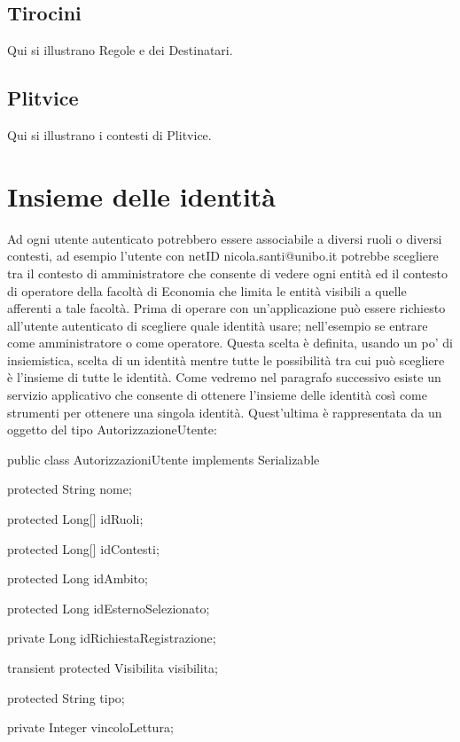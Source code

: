 \subsection{Tirocini}
Qui si illustrano Regole e dei Destinatari.

\subsection{Plitvice}
Qui si illustrano i contesti di Plitvice.

\section{Insieme delle identità }
Ad ogni utente autenticato potrebbero essere associabile a diversi ruoli o diversi contesti, ad esempio l'utente con netID nicola.santi@unibo.it potrebbe scegliere tra il contesto di amministratore che consente di vedere ogni entità ed il contesto di operatore della facoltà di Economia che limita le entità visibili a quelle afferenti a tale facoltà. 
Prima di operare con un'applicazione può essere richiesto all'utente autenticato di scegliere quale identità usare; nell'esempio se entrare come amministratore o come operatore. Questa scelta è definita, usando un po' di insiemistica, scelta di un identità mentre tutte le possibilità tra cui può scegliere è l'insieme di tutte le identità. 
Come vedremo nel paragrafo successivo esiste un servizio applicativo che consente di ottenere l'insieme delle identità così come strumenti per ottenere una singola identità. Quest'ultima è rappresentata da un oggetto del tipo AutorizzazioneUtente:

\begin{java}

public class AutorizzazioniUtente implements Serializable {
  
  protected String nome;
  
  protected Long[] idRuoli;

  protected Long[] idContesti;

  protected Long idAmbito;

  protected Long idEsternoSelezionato;
  
  private Long idRichiestaRegistrazione;
  
  transient protected Visibilita visibilita;

  protected String tipo;

  private Integer vincoloLettura;

}

\end{java}


